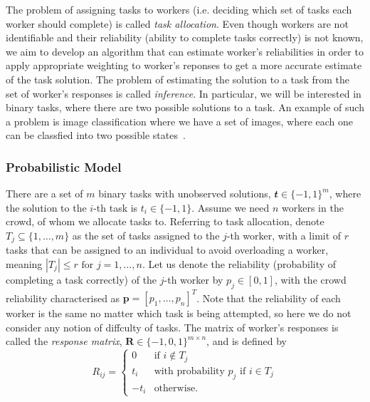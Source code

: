 \documentclass[12pt]{article}
\numberwithin{equation}{section}
\begin{document}
The problem of assigning tasks to workers (i.e. deciding which set of tasks each worker should complete) is called \textit{task allocation}. Even though workers are not identifiable and their reliability (ability to complete tasks correctly) is not known, we aim to develop an algorithm that can estimate worker's reliabilities in order to apply appropriate weighting to worker's reponses to get a more accurate estimate of the task solution. The problem of estimating the solution to a task from the set of worker's responses is called \textit{inference}. In particular, we will be interested in binary tasks, where there are two possible solutions to a task. An example of such a problem is image classification where we have a set of images, where each one can be classfied into two possible states~\cite{KOS13}.

\subsubsection{Probabilistic Model}
\label{sec:background;subsec:crowdsourcingSystems;subsubsec:probabilisticModel}

There are a set of $m$ binary tasks with unobserved solutions, $\mathbfit{t} \in \{-1,1\}^{m}$, where the solution to the $i$-th task is $t_{i} \in \{-1,1\}$. Assume we need $n$ workers in the crowd, of whom we allocate tasks to. Referring to task allocation, denote $T_{j} \subseteq \{1,\dots,m\}$ as the set of tasks assigned to the $j$-th worker, with a limit of $r$ tasks that can be assigned to an individual to avoid overloading a worker, meaning $\left\vert{T_{j}}\right\vert \le r \text{ for } j=1,\dots,n$. Let us denote the reliability (probability of completing a task correctly) of the $j$-th worker by $p_{j} \in [0,1]$, with the crowd reliability characterised as $\mathbf{p} = [p_{1},\dots,p_{n}]^{T}$. Note that the reliability of each worker is the same no matter which task is being attempted, so here we do not consider any notion of diffculty of tasks. The matrix of worker's responses is called the \textit{response matrix}, $\mathbf{R} \in \{-1,0,1\}^{m \times n}$, and is defined by
\begin{equation*}
	R_{ij} =
	\begin{cases}
		0 & \text{if } i \not \in T_{j}\\
		t_{i} & \text{with probability }  p_{j} \text{ if } i \in T_{j}\\
		-t_{i} & \text{otherwise}.
	\end{cases}
\end{equation*}
\end{document}
